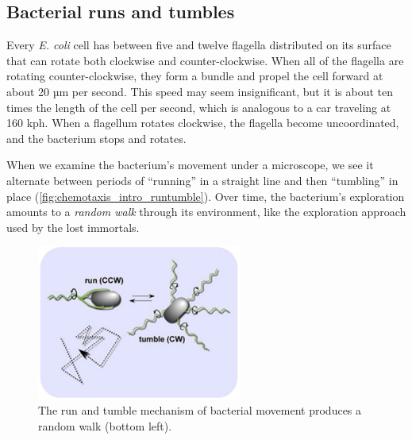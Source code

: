 \subsection{Bacterial runs and tumbles}

Every \textit{E. coli} cell has between five and twelve flagella distributed on its surface that can rotate both clockwise and counter-clockwise. When all of the flagella are rotating counter-clockwise, they form a bundle and propel the cell forward at about 20 µm per second. This speed may seem insignificant, but it is about ten times the length of the cell per second, which is analogous to a car traveling at 160 kph. When a flagellum rotates clockwise, the flagella become uncoordinated, and the bacterium stops and rotates.

When we examine the bacterium's movement under a microscope, we see it alternate between periods of ``running'' in a straight line and then ``tumbling'' in place (\autoref{fig:chemotaxis_intro_runtumble}). Over time, the bacterium's  exploration amounts to a \textit{random walk} through its environment, like the exploration approach used by the lost immortals.\\

\begin{figure}[h]
\centering
\mySfFamily
\includegraphics[width = 0.6\textwidth]{../images/chemotaxis_intro_runtumble.png}
\caption{The run and tumble mechanism of bacterial movement produces a random walk (bottom left).}
\label{fig:chemotaxis_intro_runtumble}
\end{figure}

\begin{qbox}\end{qbox}

